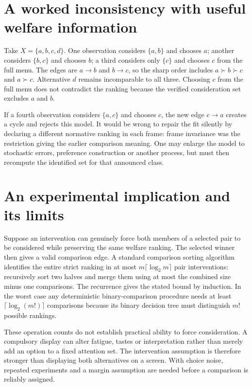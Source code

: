 \documentclass[11pt,a4paper]{article}
\begin{document}
\section{A worked inconsistency with useful welfare information}
Take $X=\{a,b,c,d\}$. One observation considers $\{a,b\}$ and chooses $a$; another considers $\{b,c\}$ and chooses $b$; a third considers only $\{c\}$ and chooses $c$ from the full menu. The edges are $a\to b$ and $b\to c$, so the sharp order includes $a\succ b\succ c$ and $a\succ c$. Alternative $d$ remains incomparable to all three. Choosing $c$ from the full menu does not contradict the ranking because the verified consideration set excludes $a$ and $b$.

If a fourth observation considers $\{a,c\}$ and chooses $c$, the new edge $c\to a$ creates a cycle and rejects this model. It would be wrong to repair the fit silently by declaring a different normative ranking in each frame: frame invariance was the restriction giving the earlier comparison meaning. One may enlarge the model to stochastic errors, preference construction or another process, but must then recompute the identified set for that announced class.

\section{An experimental implication and its limits}
Suppose an intervention can genuinely force both members of a selected pair to be considered while preserving the same welfare ranking. The selected winner then gives a valid comparison edge. A standard comparison sorting algorithm identifies the entire strict ranking in at most $m\lceil\log_2m\rceil$ pair interventions: recursively sort two halves and merge them using at most the combined size minus one comparisons. The recurrence gives the stated bound by induction. In the worst case any deterministic binary-comparison procedure needs at least $\lceil\log_2(m!)\rceil$ comparisons because its binary decision tree must distinguish $m!$ possible rankings.

These operation counts do not establish practical ability to force consideration. A compulsory display can alter fatigue, tastes or interpretation rather than merely add an option to a fixed attention set. The intervention assumption is therefore stronger than displaying both alternatives on a screen. With choice noise, repeated experiments and a margin assumption are needed before a comparison is reliably assigned.
\end{document}
